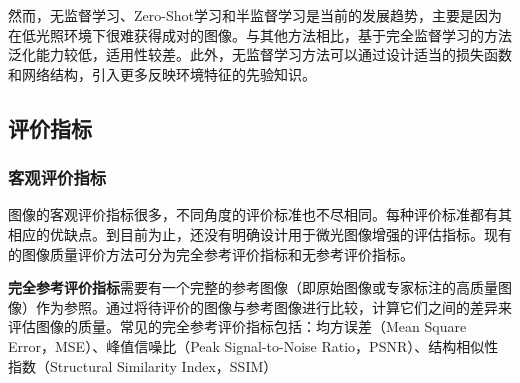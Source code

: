 \documentclass[a4paper]{ctexart}
\begin{document}
	然而，无监督学习、Zero-Shot学习和半监督学习是当前的发展趋势，主要是因为在低光照环境下很难获得成对的图像。与其他方法相比，基于完全监督学习的方法泛化能力较低，适用性较差。此外，无监督学习方法可以通过设计适当的损失函数和网络结构，引入更多反映环境特征的先验知识。
	
	\subsection{评价指标}
	
	\subsubsection{客观评价指标}
	
	图像的客观评价指标很多，不同角度的评价标准也不尽相同。每种评价标准都有其相应的优缺点。到目前为止，还没有明确设计用于微光图像增强的评估指标。现有的图像质量评价方法可分为完全参考评价指标和无参考评价指标。
	
	\textbf{完全参考评价指标}需要有一个完整的参考图像（即原始图像或专家标注的高质量图像）作为参照。通过将待评价的图像与参考图像进行比较，计算它们之间的差异来评估图像的质量。常见的完全参考评价指标包括：均方误差（Mean Square Error，MSE）、峰值信噪比（Peak Signal-to-Noise Ratio，PSNR）、结构相似性指数（Structural Similarity Index，SSIM）
	
\end{document}
